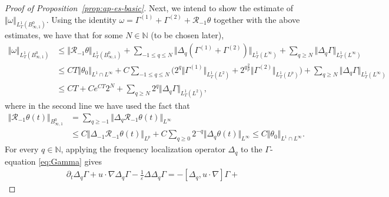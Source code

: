 \documentclass[reqno,11pt,a4paper]{amsart}
\begin{document}
\begin{proof}[Proof of Proposition~\ref{prop:ap-es-basic}]
Next, we intend to show the estimate of $\Vert \omega\Vert _{L^1_T(B^0_{\infty,1})}$. 
Using the identity $\omega= \Gamma^{(1)} + \Gamma^{(2)} +  \mathcal{R}_{-1}\theta$ 
together with the above estimates, we have that for some $N\in \mathbb{N}$ (to be chosen later),
\begin{align*}
  \Vert \omega\Vert _{L^1_T(B^0_{\infty,1})} & \leq \Vert \mathcal{R}_{-1}\theta\Vert _{L^1_T(B^0_{\infty,1})} 
  + \sum_{-1\leq q\leq N} \Vert \Delta_q (\Gamma^{(1)} + \Gamma^{(2)})\Vert _{L^1_T(L^\infty)} 
  + \sum_{q\geq N} \Vert \Delta_q \Gamma\Vert _{L^1_T(L^\infty)} \\
  & \leq C T\Vert \theta_0\Vert _{L^1\cap L^\infty} + 
  C \sum_{-1\leq q\leq N}\Big(2^q \Vert \Gamma^{(1)}\Vert _{L^1_T(L^2)} 
  + 2^{q \frac{2}{p}} \Vert \Gamma^{(2)}\Vert _{L^1_T(L^p)} \Big) 
  + \sum_{q\geq N} \Vert \Delta_q \Gamma\Vert _{L^1_T(L^\infty)} \\
  & \leq CT + C e^{CT} 2^N +  \sum_{q\geq N} 2^q\Vert \Delta_q \Gamma\Vert _{L^1_T(L^2)},
\end{align*}
where in the second line we have used the fact that 
\begin{equation}\label{eq:R-1-the-bdd}
\begin{split}
  \Vert \mathcal{R}_{-1}\theta(t)\Vert _{B^0_{\infty,1}} & = \sum_{q\geq -1} \Vert \Delta_q \mathcal{R}_{-1}\theta(t)\Vert _{L^\infty} \\
  & \leq C \Vert \Delta_{-1} \mathcal{R}_{-1}\theta(t)\Vert _{L^p} + C \sum_{q\geq 0} 2^{-q} 
  \Vert \Delta_q \theta(t)\Vert _{L^\infty}
  \leq C\Vert \theta_0\Vert _{L^1\cap L^\infty}.
\end{split}
\end{equation}
For every $q\in \mathbb{N}$, applying the frequency localization operator $\Delta_q$ to the $\Gamma$-equation \eqref{eq:Gamma} gives
\begin{equation}\label{eq:Delta-q-Gamm-2}
\begin{aligned}
  \partial_t \Delta_q\Gamma + u \cdot \nabla \Delta_q\Gamma - \frac{1}{\varepsilon}\Delta \Delta_q\Gamma
  = - \left[\Delta_q, u \cdot \nabla\right] \Gamma +

\end{aligned}
\end{equation}
\end{proof}
\end{document}
